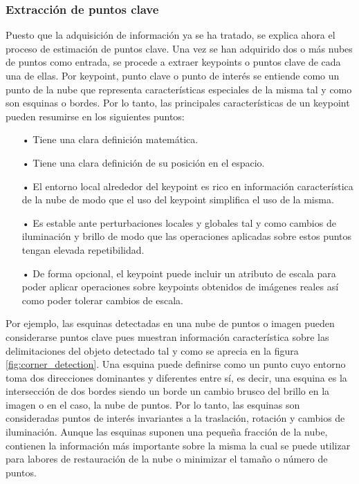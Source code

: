 \subsubsection{Extracción de puntos clave}
Puesto que la adquisición de información ya se ha tratado, se explica ahora el proceso de estimación de puntos clave\cite{puntos_clave}. Una vez se han adquirido dos o más nubes de puntos como entrada, se procede a extraer keypoints o puntos clave de cada una de ellas. Por keypoint, punto clave o punto de interés se entiende como un punto de la nube que representa características especiales de la misma tal y como son esquinas o bordes. Por lo tanto, las principales características de un keypoint pueden resumirse en los siguientes puntos:


\begin{itemize}
\item[•] Tiene una clara definición matemática.
\item[•] Tiene una clara definición de su posición en el espacio.
\item[•] El entorno local alrededor del keypoint es rico en información característica de la nube de modo que el uso del keypoint simplifica el uso de la misma.
\item[•] Es estable ante perturbaciones locales y globales tal y como cambios de iluminación y brillo de modo que las operaciones aplicadas sobre estos puntos tengan elevada repetibilidad.
\item[•] De forma opcional, el keypoint puede incluir un atributo de escala para poder aplicar operaciones sobre keypoints obtenidos de imágenes reales así como poder tolerar cambios de escala.
\end{itemize}


Por ejemplo, las esquinas detectadas en una nube de puntos o imagen pueden considerarse puntos clave pues muestran información característica\cite{puntos_clave_pwp} sobre las delimitaciones del objeto detectado tal y como se aprecia en la figura \ref{fig:corner_detection}. Una esquina puede definirse como un punto cuyo entorno toma dos direcciones dominantes y diferentes entre sí, es decir, una esquina es la intersección de dos bordes siendo un borde un cambio brusco del brillo en la imagen o en el caso, la nube de puntos. Por lo tanto, las esquinas son consideradas puntos de interés invariantes a la traslación, rotación y cambios de iluminación. 
Aunque las esquinas suponen una pequeña fracción de la nube, contienen la información más importante sobre la misma la cual se puede utilizar para labores de restauración de la nube o minimizar el tamaño o número de puntos.

